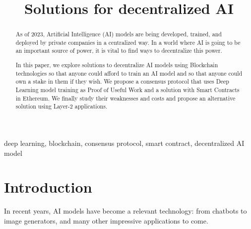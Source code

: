 \documentclass[conference]{IEEEtran}
\begin{document}
\title{Solutions for decentralized AI\\
}

\author{
\and
{}
\and
{}
}
\maketitle

\begin{abstract}
As of 2023, Artificial Intelligence (AI) models are being developed, trained, and deployed by private companies in a centralized way. In a world where AI is going to be an important source of power, it is vital to find ways to decentralize this power.

In this paper, we explore solutions to decentralize AI models using Blockchain technologies so that anyone could afford to train an AI model and so that anyone could own a stake in them if they wish. We propose a consensus protocol that uses Deep Learning model training as Proof of Useful Work and a solution with Smart Contracts in Ethereum. We finally study their weaknesses and costs and propose an alternative solution using Layer-2 applications.
\end{abstract}

\begin{IEEEkeywords}
deep learning, blockchain, consensus protocol, smart contract, decentralized AI model
\end{IEEEkeywords}

\section{Introduction}
In recent years, AI models have become a relevant technology: from chatbots to image generators, and many other impressive applications to come.
\end{document}
